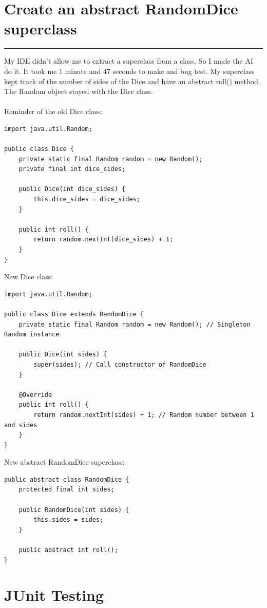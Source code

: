 \documentclass[a4paper,11pt]{article}
\begin{document}
\section*{Create an abstract RandomDice superclass}
\hrule
\vspace{10pt} %
My IDE didn't allow me to extract a superclass from a class. So I made the AI do it. It took me 1 minute and 47 seconds to make and bug test. My superclass kept track of the number of sides of the Dice and have an abstract roll() method. The Random object stayed with the Dice class.\\\\
Reminder of the old Dice class:
\begin{lstlisting}
import java.util.Random;

public class Dice {
    private static final Random random = new Random();
    private final int dice_sides;

    public Dice(int dice_sides) {
        this.dice_sides = dice_sides;
    }

    public int roll() {
        return random.nextInt(dice_sides) + 1; 
    }
}
\end{lstlisting} 
New Dice class: \begin{lstlisting}
import java.util.Random;

public class Dice extends RandomDice {
    private static final Random random = new Random(); // Singleton Random instance

    public Dice(int sides) {
        super(sides); // Call constructor of RandomDice
    }

    @Override
    public int roll() {
        return random.nextInt(sides) + 1; // Random number between 1 and sides
    }
}
\end{lstlisting}
New abstract RandomDice superclass: \begin{lstlisting}
public abstract class RandomDice {
    protected final int sides;

    public RandomDice(int sides) {
        this.sides = sides;
    }

    public abstract int roll();
}
\end{lstlisting}

\section*{JUnit Testing}
\end{document}
